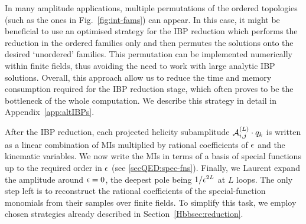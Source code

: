 \documentclass[main.tex]{subfiles}
\begin{document}
In many amplitude applications, multiple permutations of the ordered topologies (such as the ones in Fig.~\ref{fig:int-fams}) can appear. In this case, it might be beneficial to use an optimised strategy for the IBP reduction which performs the reduction in the ordered families only and then permutes the solutions onto the desired `unordered' families. This permutation can be implemented numerically within finite fields, thus avoiding the need to work with large analytic IBP solutions. Overall, this approach allow us to reduce the time and memory consumption required for the IBP reduction stage, which often proves to be the bottleneck of the whole computation. We describe this strategy in detail in Appendix~\ref{app:altIBPs}.

After the IBP reduction, each projected helicity subamplitude $\mathcal{A}^{(L)}_{i,j}\cdot q_k$
is written as a linear combination of MIs multiplied by rational
coefficients of $\epsilon$ and the kinematic variables. We now write the MIs
in terms of a basis of special functions up to the required order in $\epsilon$
(see \cref{secQED:spec-fns}). Finally, we Laurent expand the amplitude around
$\epsilon=0$, the deepest pole being $1/\epsilon^{2 L}$ at $L$ loops. The only step
left is to reconstruct the rational coefficients of the special-function
monomials from their samples over finite fields. To simplify this task, we employ chosen strategies already described in Section~\ref{Hbbsec:reduction}.
\end{document}
